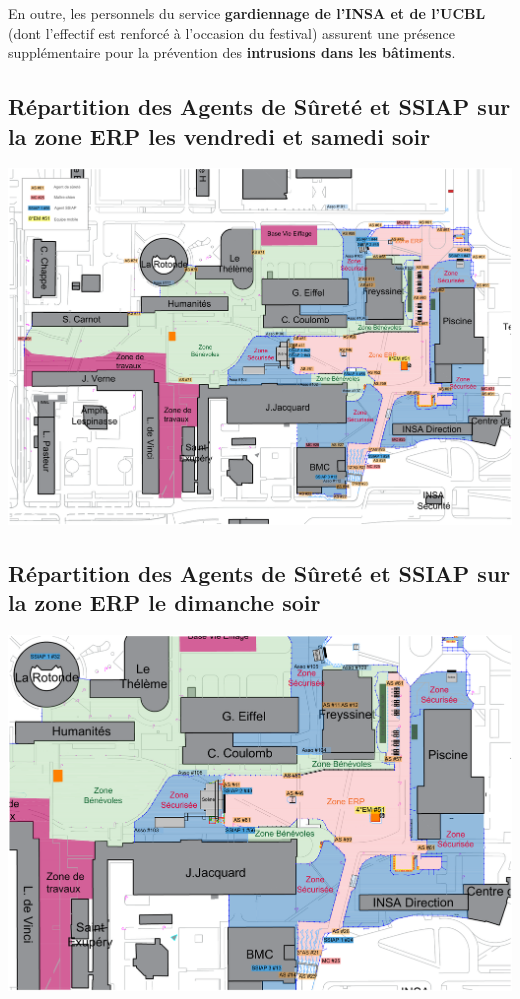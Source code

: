 \documentclass[hidelinks, paper=a4, fontsize=13pt]{report}
\begin{document}
En outre, les personnels du service \textbf{gardiennage de l’INSA et de l’UCBL} (dont l'effectif est renforcé à l'occasion du festival) assurent une présence supplémentaire pour la prévention des \textbf{intrusions dans les bâtiments}.


\subsection{Répartition des Agents de Sûreté et SSIAP sur la zone ERP les vendredi et samedi soir}
\label{refRepartitionAgentsDeSurete}
\begin{center}
	\includegraphics[width=\textwidth,keepaspectratio, angle=90]{Exports/Plan_24h_45eme-AS_Nuit}
\end{center}

\subsection{Répartition des Agents de Sûreté et SSIAP sur la zone ERP le dimanche soir}
\label{refRepartitionAgentsDeSureteDimanche}
\begin{center}
	\includegraphics[width=\textwidth,keepaspectratio, angle=90]{Exports/Plan_24h_45eme-AS_Dimanche}
\end{center}
\end{document}
